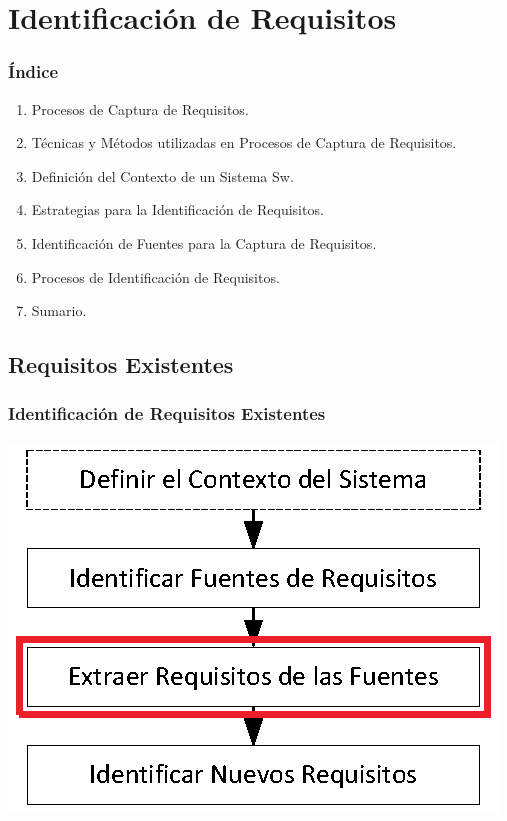 ﻿\documentclass[handout,a4paper,slidestop,xcolor=pst,dvips,blue]{beamer}
\begin{document}
\section{Identificación de Requisitos}

\begin{frame}[c]
    \frametitle{Índice}
    \begin{enumerate}
         \item Procesos de Captura de Requisitos.
         \item Técnicas y Métodos utilizadas en Procesos de Captura de Requisitos.
         \item Definición del Contexto de un Sistema Sw.
         \item Estrategias para la Identificación de Requisitos.
         \item Identificación de Fuentes para la Captura de Requisitos.
         \item \alert{Procesos de Identificación de Requisitos}.
         \item Sumario.
    \end{enumerate}
\end{frame}

\subsection{Requisitos Existentes}

\begin{frame}[c]
    \frametitle{Identificación de Requisitos Existentes}
    \begin{center}
        \includegraphics[width=0.75\linewidth]{images/proceso/requisitosViejos.eps}
    \end{center}
\end{frame}
\end{document}
